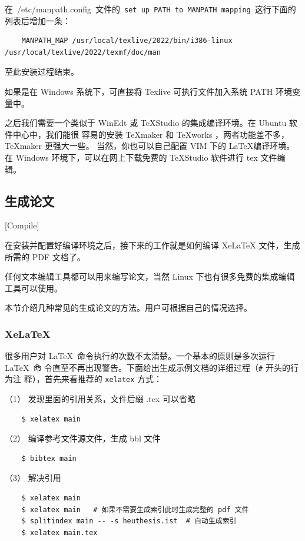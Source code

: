 在~{/etc/manpath.config}~文件的~\texttt{set up PATH to  MANPATH mapping}~这行下面的列表后增加一条：

\begin{lstlisting}
    MANPATH_MAP /usr/local/texlive/2022/bin/i386-linux /usr/local/texlive/2022/texmf/doc/man
\end{lstlisting}

至此安装过程结束。

如果是在 Windows 系统下，可直接将 Texlive 可执行文件加入系统 PATH 环境变量中。

之后我们需要一个类似于 WinEdt 或 TeXStudio 的集成编译环境。在 Ubuntu 软件中心中，我们能很
容易的安装 \TeX{}maker 和 \TeX{}works ，两者功能差不多， \TeX{}maker 更强大一些。
当然，你也可以自己配置 VIM 下的 \LaTeX{}编译环境。在 Windows 环境下，可以在网上下载免费的
TeXStudio 软件进行 tex 文件编辑。

\subsection{生成论文}[Compile]

在安装并配置好编译环境之后，接下来的工作就是如何编译 Xe\LaTeX{} 文件，生成
所需的 PDF 文档了。

任何文本编辑工具都可以用来编写论文，当然 Linux 下也有很多免费的集成编辑工具可以使用。

本节介绍几种常见的生成论文的方法。用户可根据自己的情况选择。

\subsubsection{XeLaTeX}

很多用户对 \LaTeX\ 命令执行的次数不太清楚。一个基本的原则是多次运行 \LaTeX\ 命
令直至不再出现警告。下面给出生成示例文档的详细过程（\texttt{\#} 开头的行为注
释），首先来看推荐的 \texttt{xelatex} 方式：

（1） 发现里面的引用关系，文件后缀 .tex 可以省略

\begin{lstlisting}
    $ xelatex main
\end{lstlisting}

（2） 编译参考文件源文件，生成 bbl 文件

\begin{lstlisting}
    $ bibtex main
\end{lstlisting}

（3） 解决引用

\begin{lstlisting}
    $ xelatex main
    $ xelatex main   # 如果不需要生成索引此时生成完整的 pdf 文件
    $ splitindex main -- -s heuthesis.ist  # 自动生成索引
    $ xelatex main.tex
\end{lstlisting}

